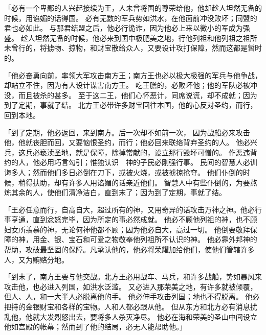{\par }{\PP {}「必有一个卑鄙的人兴起接续为王，人未曾将国的尊荣给他，他却趁人坦然无备的时候，用谄媚的话得国。
必有无数的军兵势如洪水，在他面前冲没败坏；同盟的君也必如此。
与那君结盟之后，他必行诡诈，因为他必上来以微小的军成为强盛。
趁人坦然无备的时候，他必来到国中极肥美之地，行他列祖和他列祖之祖所未曾行的，将掳物、掠物，和财宝散给众人，又要设计攻打保障，然而这都是暂时的。
\par }{\PP {}「他必奋勇向前，率领大军攻击南方王；南方王也必以极大极强的军兵与他争战，却站立不住，因为有人设计谋害南方王。
吃王膳的，必败坏他；他的军队必被冲没，而且被杀的甚多。
至于这二王，他们心怀恶计，同席说谎，{}却不成就；因为到了定期，事就了结。
北方王必带许多财宝回往本国，他的心反对圣约，{}而行，回到本地。
\par }{\PP {}「到了定期，他必返回，来到南方。后一次却不如前一次，
因为{}战船必来攻击他，他就丧胆而回，又要恼恨圣约，{}而行；他必回来联络背弃圣约的人。
他必兴兵，这兵必亵渎圣地，就是保障，除掉常献的{}，设立那行毁坏可憎的。
作恶违背{}约的人，他必用巧言勾引；惟独认识　神的子民必刚强行事。
民间的智慧人必训诲多人；然而他们多日必倒在刀下，或被火烧，或被掳掠抢夺。
他们仆倒的时候，稍得扶助，却有许多人用谄媚的话亲近他们。
智慧人中有些仆倒的，为要熬炼其余的人，使他们清净洁白，直到末了；因为到了定期，事就了结。
\par }{\PP {}「王必任意而行，自高自大，超过所有的神，又用奇异的话攻击万神之神。他必行事亨通，直到{}忿怒完毕，因为所定的事必然成就。
他必不顾他列祖的神，也不顾妇女所羡慕的神，无论何神他都不顾；因为他必自大，高过一切。
他倒要敬拜保障的神，用金、银、宝石和可爱之物敬奉他列祖所不认识的神。
他必靠外邦神的帮助，攻破最坚固的保障。凡承认他的，他必将荣耀加给他们，使他们管辖许多人，又为贿赂分地{}。
\par }{\PP {}「到末了，南方王要与他交战。北方王必用战车、马兵，和许多战船，势如暴风来攻击他，也必进入列国，如洪水泛滥。
又必进入那荣美之地，有许多{}就被倾覆，但{}人、{}人，和一大半{}人必脱离他的手。
他必伸手攻击列国；{}地也不得脱离。
他必把持{}的金银财宝和各样的宝物。{}人和{}人都必跟从他。
但从东方和北方必有消息扰乱他，他就大发烈怒出去，要将多人杀灭净尽。
他必在海和荣美的圣山中间设立他如宫殿的帐幕；然而到了他的结局，必无人能帮助他。」

}
